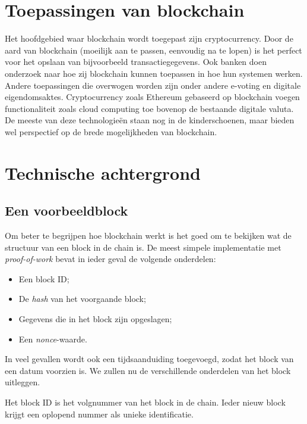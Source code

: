 \documentclass{article}
\begin{document}
\section{Toepassingen van blockchain}
Het hoofdgebied waar blockchain wordt toegepast zijn cryptocurrency. Door de aard van blockchain (moeilijk aan te passen, eenvoudig na te lopen) is het perfect voor het opslaan van bijvoorbeeld transactiegegevens. Ook banken doen onderzoek naar hoe zij blockchain kunnen toepassen in hoe hun systemen werken. Andere toepassingen die overwogen worden zijn onder andere e-voting en digitale eigendomsaktes. Cryptocurrency zoals Ethereum gebaseerd op blockchain voegen functionaliteit zoals cloud computing toe bovenop de bestaande digitale valuta. De meeste van deze technologieën staan nog in de kinderschoenen, maar bieden wel perspectief op de brede mogelijkheden van blockchain.	
\section{Technische achtergrond}
\subsection{Een voorbeeldblock}
Om beter te begrijpen hoe blockchain werkt is het goed om te bekijken wat de structuur van een block in de chain is. De meest simpele implementatie met \textit{proof-of-work} bevat in ieder geval de volgende onderdelen:
\begin{itemize}
\item Een block ID;
\item De \textit{hash} van het voorgaande block;
\item Gegevens die in het block zijn opgeslagen;
\item Een \textit{nonce}-waarde.
\end{itemize}
In veel gevallen wordt ook een tijdsaanduiding toegevoegd, zodat het block van een datum voorzien is. We zullen nu de verschillende onderdelen van het block uitleggen.

Het block ID is het volgnummer van het block in de chain. Ieder nieuw block krijgt een oplopend nummer als unieke identificatie. 
\end{document}
